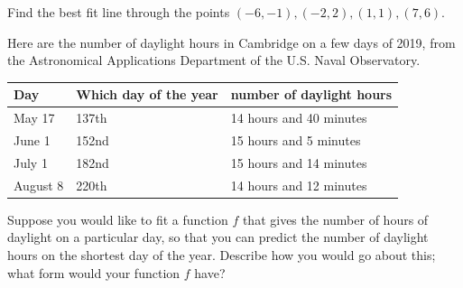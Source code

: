 \documentclass[12pt,letterpaper]{article}
\begin{document}
\begin{enumerate}
\vfill

\newpage

\Problem Find the best fit line through the points $(-6,-1), (-2,2), (1,1), (7,6).$

\vfill

\Problem   Here are the number of daylight hours in Cambridge on a few days of
  2019, from the Astronomical Applications Department of the
  U.S. Naval Observatory.

  \begin{center}
    \begin{tabular}{l l l}
      Day & Which day of the year & number of daylight hours \\
      \hline
      May 17 & 137th & 14 hours and 40 minutes \\
      June 1 & 152nd & 15 hours and 5 minutes \\
      July 1 & 182nd & 15 hours and 14 minutes \\
      August 8 & 220th & 14 hours and 12 minutes
    \end{tabular}
  \end{center}

  Suppose you would like to fit a function $f$ that gives the
  number of hours of daylight on a particular day, so that you can
  predict the number of daylight hours on the shortest day of the
  year.  Describe how you would go about this; what form would your
  function $f$ have? 
  
  \vfill

\newpage

\end{enumerate}
\end{document}
